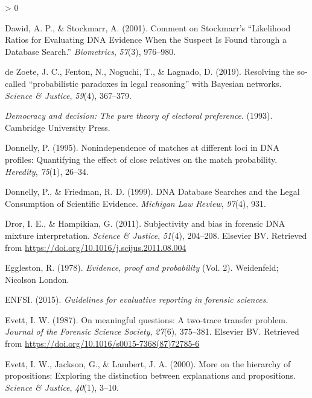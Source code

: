 \documentclass[
  10pt,
  dvipsnames,enabledeprecatedfontcommands]{scrartcl}
\newlength{\cslhangindent}
\newenvironment{CSLReferences}[2] %
 {%
  \setlength{\parindent}{0pt}
  \ifodd #1 \everypar{\setlength{\hangindent}{\cslhangindent}}\ignorespaces\fi
  \ifnum #2 > 0
  \setlength{\parskip}{#2\baselineskip}
  \fi
 }%
 {}
\begin{document}
\begin{CSLReferences}{1}{0}
\leavevmode\hypertarget{ref-dawid2001CommentStockmarrLikelihood}{}%
Dawid, A. P., \& Stockmarr, A. (2001). Comment on {Stockmarr}'s
{``{Likelihood Ratios} for {Evaluating DNA Evidence When} the {Suspect
Is Found} through a {Database Search}.''} \emph{Biometrics},
\emph{57}(3), 976--980.

\leavevmode\hypertarget{ref-dezoete2019ResolvingSocalledProbabilistic}{}%
de Zoete, J. C., Fenton, N., Noguchi, T., \& Lagnado, D. (2019).
Resolving the so-called {``probabilistic paradoxes in legal reasoning''}
with {Bayesian} networks. \emph{Science \& Justice}, \emph{59}(4),
367--379.

\leavevmode\hypertarget{ref-brennan_lomasky_1993}{}%
\emph{Democracy and decision: The pure theory of electoral preference}.
(1993). Cambridge University Press.

\leavevmode\hypertarget{ref-donnelly1995NonindependenceMatchesDifferent}{}%
Donnelly, P. (1995). Nonindependence of matches at different loci in
{DNA} profiles: Quantifying the effect of close relatives on the match
probability. \emph{Heredity}, \emph{75}(1), 26--34.

\leavevmode\hypertarget{ref-donnelly1999DNADatabaseSearches}{}%
Donnelly, P., \& Friedman, R. D. (1999). {DNA Database Searches} and the
{Legal Consumption} of {Scientific Evidence}. \emph{Michigan Law
Review}, \emph{97}(4), 931.

\leavevmode\hypertarget{ref-Dror2011subjectivity}{}%
Dror, I. E., \& Hampikian, G. (2011). Subjectivity and bias in forensic
{DNA} mixture interpretation. \emph{Science {\&} Justice}, \emph{51}(4),
204--208. Elsevier {BV}. Retrieved from
\url{https://doi.org/10.1016/j.scijus.2011.08.004}

\leavevmode\hypertarget{ref-eggleston1978evidence}{}%
Eggleston, R. (1978). \emph{Evidence, proof and probability} (Vol. 2).
Weidenfeld; Nicolson London.

\leavevmode\hypertarget{ref-enfs2015}{}%
ENFSI. (2015). \emph{Guidelines for evaluative reporting in forensic
sciences}.

\leavevmode\hypertarget{ref-Evett1987}{}%
Evett, I. W. (1987). On meaningful questions: A two-trace transfer
problem. \emph{Journal of the Forensic Science Society}, \emph{27}(6),
375--381. Elsevier {BV}. Retrieved from
\url{https://doi.org/10.1016/s0015-7368(87)72785-6}

\leavevmode\hypertarget{ref-evett2000MoreHierarchyPropositions}{}%
Evett, I. W., Jackson, G., \& Lambert, J. A. (2000). More on the
hierarchy of propositions: Exploring the distinction between
explanations and propositions. \emph{Science \& Justice}, \emph{40}(1),
3--10.


\end{CSLReferences}
\end{document}
